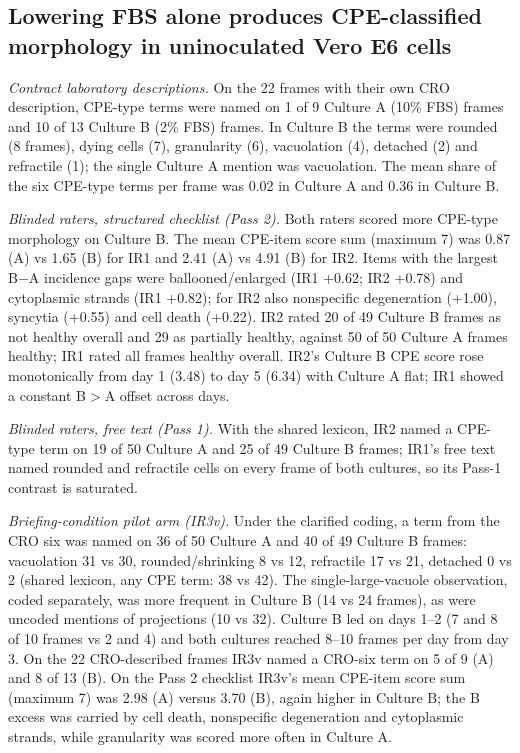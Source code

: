 \subsection*{Lowering FBS alone produces CPE-classified morphology in uninoculated Vero E6 cells}
\emph{Contract laboratory descriptions.} On the 22 frames with their own CRO description, CPE-type terms were named on 1 of 9 Culture A (10\% FBS) frames and 10 of 13 Culture B (2\% FBS) frames. In Culture B the terms were rounded (8 frames), dying cells (7), granularity (6), vacuolation (4), detached (2) and refractile (1); the single Culture A mention was vacuolation. The mean share of the six CPE-type terms per frame was 0.02 in Culture A and 0.36 in Culture B.

\emph{Blinded raters, structured checklist (Pass 2).} Both raters scored more CPE-type morphology on Culture B. The mean CPE-item score sum (maximum 7) was 0.87 (A) vs 1.65 (B) for IR1 and 2.41 (A) vs 4.91 (B) for IR2. Items with the largest B$-$A incidence gaps were ballooned/enlarged (IR1 +0.62; IR2 +0.78) and cytoplasmic strands (IR1 +0.82); for IR2 also nonspecific degeneration (+1.00), syncytia (+0.55) and cell death (+0.22). IR2 rated 20 of 49 Culture B frames as not healthy overall and 29 as partially healthy, against 50 of 50 Culture A frames healthy; IR1 rated all frames healthy overall. IR2's Culture B CPE score rose monotonically from day 1 (3.48) to day 5 (6.34) with Culture A flat; IR1 showed a constant B$>$A offset across days.

\emph{Blinded raters, free text (Pass 1).} With the shared lexicon, IR2 named a CPE-type term on 19 of 50 Culture A and 25 of 49 Culture B frames; IR1's free text named rounded and refractile cells on every frame of both cultures, so its Pass-1 contrast is saturated.

\emph{Briefing-condition pilot arm (IR3v).} Under the clarified coding, a term from the CRO six was named on 36 of 50 Culture A and 40 of 49 Culture B frames: vacuolation 31 vs 30, rounded/shrinking 8 vs 12, refractile 17 vs 21, detached 0 vs 2 (shared lexicon, any CPE term: 38 vs 42). The single-large-vacuole observation, coded separately, was more frequent in Culture B (14 vs 24 frames), as were uncoded mentions of projections (10 vs 32). Culture B led on days 1--2 (7 and 8 of 10 frames vs 2 and 4) and both cultures reached 8--10 frames per day from day 3. On the 22 CRO-described frames IR3v named a CRO-six term on 5 of 9 (A) and 8 of 13 (B). On the Pass 2 checklist IR3v's mean CPE-item score sum (maximum 7) was 2.98 (A) versus 3.70 (B), again higher in Culture B; the B excess was carried by cell death, nonspecific degeneration and cytoplasmic strands, while granularity was scored more often in Culture A.

